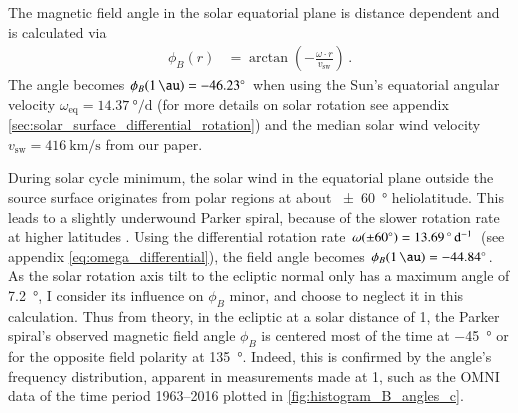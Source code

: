 The magnetic field angle in the solar equatorial plane is distance dependent and is calculated via
\begin{align}
	\phi_B(r) &= \arctan\left(-\frac{\omega \cdot r}{v_\text{sw}}\right)\,.
\end{align}
The angle becomes $\phi_B(\SI{1}{\au}) = \SI{-46.23}{\degree}$ when using the Sun's equatorial angular velocity $\omega_\text{eq} = \SI{14.37}{\degree\per\day}$ (for more details on solar rotation see appendix \autoref{sec:solar_surface_differential_rotation}) and the median solar wind velocity $v_\text{sw} = \SI{416}{\km\per\s}$ from our paper.

During solar cycle minimum, the solar wind in the equatorial plane outside the source surface originates from polar regions at about \SI{+-60}{\degree} heliolatitude. This leads to a slightly underwound Parker spiral, because of the slower rotation rate at higher latitudes \citep{Banaszkiewicz1998}. Using the differential rotation rate $\omega(\SI{+-60}{\degree}) = \SI{13.69}{\degree\per\day}$ (see appendix \autoref{eq:omega_differential}), the field angle becomes $\phi_B(\SI{1}{\au}) = \SI{-44.84}{\degree}$.\\

As the solar rotation axis tilt to the ecliptic normal only has a maximum angle of \SI{7.2}{\degree}, I consider its influence on $\phi_B$ minor, and choose to neglect it in this calculation. Thus from theory, in the ecliptic at a solar distance of \SI{1}{\au}, the Parker spiral's observed magnetic field angle $\phi_B$ is centered most of the time at \SI{-45}{\degree} or for the opposite field polarity at \SI{135}{\degree}. Indeed, this is confirmed by the angle's frequency distribution, apparent in measurements made at \SI{1}{\au}, such as the OMNI data of the time period 1963--2016 plotted in \autoref{fig:histogram_B_angles_c}.\\
\begin{figure}[htb]
\end{figure}

